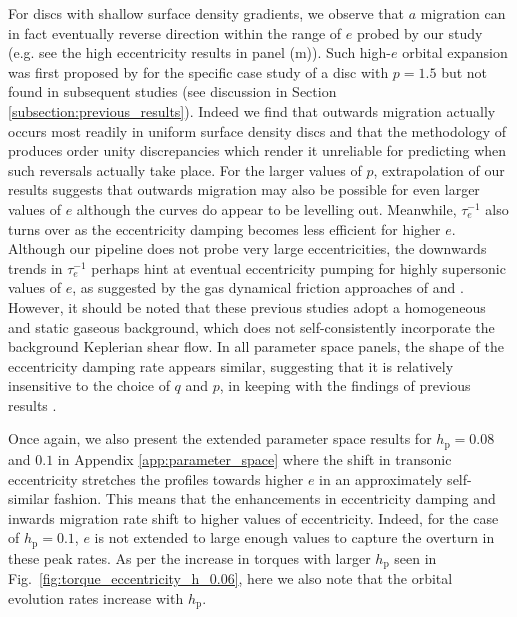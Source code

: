 For discs with shallow surface density gradients, we observe that $a$ migration can in fact eventually reverse direction within the range of $e$ probed by our study (e.g. see the high eccentricity results in panel (m)). Such high-$e$ orbital expansion was first proposed by \cite{PapaloizouLarwood_2000} for the specific case study of a disc with $p=1.5$ but not found in subsequent studies (see discussion in Section \ref{subsection:previous_results}). Indeed we find that outwards migration actually occurs most readily in uniform surface density discs and that the methodology of \cite{PapaloizouLarwood_2000} produces order unity discrepancies which render it unreliable for predicting when such reversals actually take place. For the larger values of $p$, extrapolation of our results suggests that outwards migration may also be possible for even larger values of $e$ although the curves do appear to be levelling out. Meanwhile, $\tau_{e}^{-1}$ also turns over as the eccentricity damping becomes less efficient for higher $e$. Although our pipeline does not probe very large eccentricities, the downwards trends in $\tau_{e}^{-1}$ perhaps hint at eventual eccentricity pumping for highly supersonic values of $e$, as suggested by the gas dynamical friction approaches of \cite{BuehlerEtAl_2024} and \cite{ONeill2024}. However, it should be noted that these previous studies adopt a homogeneous and static gaseous background, which does not self-consistently incorporate the background Keplerian shear flow. In all parameter space panels, the shape of the eccentricity damping rate appears similar, suggesting that it is relatively insensitive to the choice of $q$ and $p$, in keeping with the findings of previous results \citep{Artymowicz_1993,TanakaEtAl_2002}.

Once again, we also present the extended parameter space results for $h_\textrm{p} = 0.08$ and $0.1$ in Appendix \ref{app:parameter_space} where the shift in transonic eccentricity stretches the profiles towards higher $e$ in an approximately self-similar fashion. This means that the enhancements in eccentricity damping and inwards migration rate shift to higher values of eccentricity. Indeed, for the case of $h_\textrm{p} = 0.1$, $e$ is not extended to large enough values to capture the overturn in these peak rates. As per the increase in torques with larger $h_\textrm{p}$ seen in Fig.~\ref{fig:torque_eccentricity_h_0.06}, here we also note that the orbital evolution rates increase with $h_\textrm{p}$.
